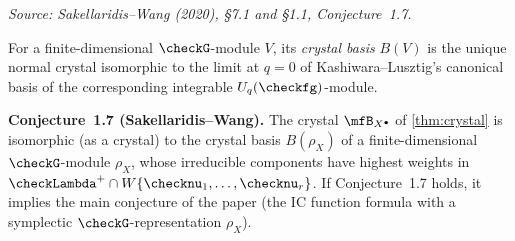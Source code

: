 \begin{definition}
  \label{def:representation-crystal}
%
  \textit{Source: Sakellaridis--Wang (2020), §7.1 and §1.1, Conjecture~1.7.}

  For a finite-dimensional \( \checkG \)-module \( V \), its \emph{crystal basis}
  \( B(V) \) is the unique normal crystal isomorphic to the limit at \( q = 0 \) of
  Kashiwara--Lusztig's canonical basis of the corresponding integrable
  \( U_q(\checkfg) \)-module.

  \textbf{Conjecture~1.7 (Sakellaridis--Wang).}
  The crystal \( \mfB_{X^\bullet} \) of \cref{thm:crystal} is isomorphic (as a crystal)
  to the crystal basis \( B(\rho_X) \) of a finite-dimensional \( \checkG \)-module
  \( \rho_X \), whose irreducible components have highest weights in
  \( \checkLambda^+ \cap W\{\checknu_1, \ldots, \checknu_r\} \).
  If Conjecture~1.7 holds, it implies the main conjecture of the paper
  (the IC function formula with a symplectic \( \checkG \)-representation \( \rho_X \)).
\end{definition}

